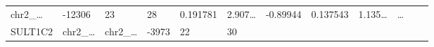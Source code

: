 \documentclass[
]{article}
\begin{document}
\begin{longtable}[]{@{}llllllllllll@{}}
\begin{minipage}[t]{0.06\columnwidth}
chr2\_\ldots{}\strut
\end{minipage} & \begin{minipage}[t]{0.06\columnwidth}\raggedright
-12306\strut
\end{minipage} & \begin{minipage}[t]{0.06\columnwidth}\raggedright
23\strut
\end{minipage} & \begin{minipage}[t]{0.06\columnwidth}\raggedright
28\strut
\end{minipage} & \begin{minipage}[t]{0.06\columnwidth}\raggedright
0.191781\strut
\end{minipage} & \begin{minipage}[t]{0.08\columnwidth}\raggedright
2.907\ldots{}\strut
\end{minipage} & \begin{minipage}[t]{0.06\columnwidth}\raggedright
-0.89944\strut
\end{minipage} & \begin{minipage}[t]{0.06\columnwidth}\raggedright
0.137543\strut
\end{minipage} & \begin{minipage}[t]{0.09\columnwidth}\raggedright
1.135\ldots{}\strut
\end{minipage} & \begin{minipage}[t]{0.02\columnwidth}\raggedright
\ldots{}\strut
\end{minipage}\tabularnewline
\begin{minipage}[t]{0.06\columnwidth}\raggedright
SULT1C2\strut
\end{minipage} & \begin{minipage}[t]{0.06\columnwidth}\raggedright
chr2\_\ldots{}\strut
\end{minipage} & \begin{minipage}[t]{0.06\columnwidth}\raggedright
chr2\_\ldots{}\strut
\end{minipage} & \begin{minipage}[t]{0.06\columnwidth}\raggedright
-3973\strut
\end{minipage} & \begin{minipage}[t]{0.06\columnwidth}\raggedright
22\strut
\end{minipage} & \begin{minipage}[t]{0.06\columnwidth}\raggedright
30\strut
\end{minipage} & \begin{minipage}[t]{0.06\columnwidth}\raggedright

\end{minipage}
\end{longtable}
\end{document}
